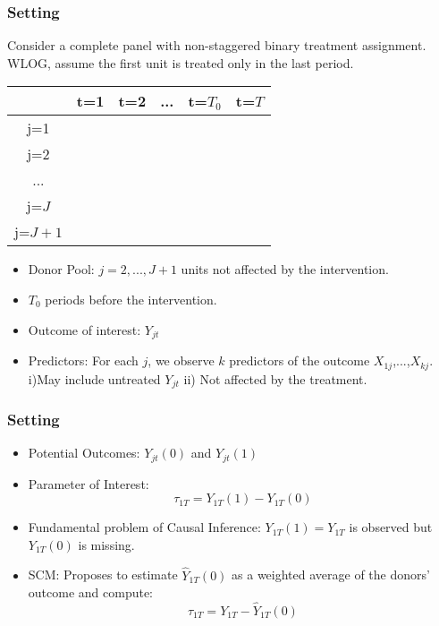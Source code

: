 \documentclass[xcolor=svgnames,t]{beamer}
\begin{document}
\begin{frame}
\frametitle{Setting}
Consider a complete panel with non-staggered binary treatment assignment.\\
WLOG, assume the first unit is treated only in the last period.
\begin{table}
    \centering
    \begin{tabular}{|c|c|c|c|c|c|}
    \hline
    & t=1 & t=2 & ... & t=$T_0$ & t=$T$ \\
    \hline
    j=1 & & & & & \cellcolor{lightgray}\\
    \hline
    j=2 &  & & & & \\
    \hline
    ... &  & & & & \\
    \hline
    j=$J$ &  & & & &\\
    \hline
    j=$J+1$ &  && & & \\
    \hline
   
    \end{tabular}
\end{table}



\begin{itemize}
    \item <1-> Donor Pool: $j=2,...,J+1$ units not affected by the intervention.
    \item <2-> $T_0$ periods before the intervention.
    \item <3-> Outcome of interest: $Y_{jt}$
    \item  <4-> Predictors: For each $j$, we observe $k$ predictors of the outcome $X_{1j}$,...,$X_{kj}$. i)May include untreated $Y_{jt}$ ii) Not affected by the treatment.
    
    \end{itemize}
\end{frame}

\begin{frame}
\frametitle{Setting}
\begin{itemize}
    \item<1-> Potential Outcomes: $Y_{jt}(0)$ and $Y_{jt}(1)$
    \item<2-> Parameter of Interest: $$\tau_{1T}=Y_{1T}(1)-Y_{1T}(0)$$
    \item<3-> Fundamental problem of Causal Inference: $Y_{1T}(1)=Y_{1T}$ is observed but $Y_{1T}(0)$ is missing.
    \item<4-> SCM: Proposes to estimate $\hat{Y}_{1T}(0)$ as a weighted average of the donors' outcome and compute: $$\hat{\tau}_{1T}=Y_{1T}-\hat{Y}_{1T}(0)$$
\end{itemize}
\end{frame}
\end{document}
